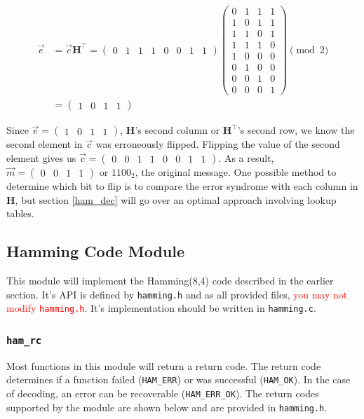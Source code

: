 \documentclass[11pt]{article}
\begin{document}
\begin{align*}
    \Vec{e} &=\Vec{c}\boldsymbol{H^{\intercal}} =\begin{pmatrix}0 & 1 & 1 & 1 & 0 & 0 & 1 & 1\end{pmatrix}
    \begin{pmatrix}
         0 & 1 & 1 & 1 \\
         1 & 0 & 1 & 1 \\
         1 & 1 & 0 & 1 \\
         1 & 1 & 1 & 0 \\
         1 & 0 & 0 & 0 \\
         0 & 1 & 0 & 0 \\
         0 & 0 & 1 & 0 \\
         0 & 0 & 0 & 1
    \end{pmatrix} \pmod{2} \\
    &= \begin{pmatrix}1 & 0 & 1 & 1 \end{pmatrix}
\end{align*}

\noindent Since $\Vec{e} = \begin{pmatrix}1 & 0 & 1 & 1 \end{pmatrix}$, $\boldsymbol{H}$'s second column or $\boldsymbol{H}^{\intercal}$'s second row, we
know the second element in $\Vec{c}$ was erroneously flipped. Flipping the value of the second element gives us
$\Vec{c} = \begin{pmatrix}0 & 0 & 1 & 1 & 0 & 0 & 1 & 1\end{pmatrix}$. 
As a result, $\Vec{m} = \begin{pmatrix}0 & 0 & 1 & 1\end{pmatrix}$ or $1100_2$, the original message.
One possible method to determine which bit to flip is to compare the error syndrome with each column in $\boldsymbol{H}$,
but section \ref{ham_dec} will go over an optimal approach involving lookup tables.

\subsection{Hamming Code Module}
This module will implement the Hamming(8,4) code described in the earlier section.
It's API is defined by \texttt{hamming.h} and as all provided files, 
\textcolor{red}{you may not modify \texttt{hamming.h}}. It's implementation should
be written in \texttt{hamming.c}.

\subsubsection{\texttt{ham\_rc}}
Most functions in this module will return a return code.
The return code determines if a function failed (\texttt{HAM\_ERR}) or was successful (\texttt{HAM\_OK}). In the 
case of decoding, an error can be recoverable (\texttt{HAM\_ERR\_OK}). The return codes supported by the module
are shown below and are provided in \texttt{hamming.h}.
\end{document}
